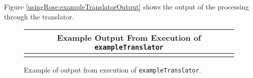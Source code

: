    Figure \ref{usingRose:exampleTranslatorOutput} shows the output 
of the processing through the translator.

{\indent
{\mySmallFontSize

\begin{latexonly}
\begin{figure}[tb]
\begin{center}
\begin{tabular}{|c|} \hline
     Example Output From Execution of {\tt exampleTranslator}
\\\hline\hline

\\\hline
\end{tabular}
\end{center}
\caption{ Example of output from execution of {\tt exampleTranslator}. }
\end{figure}
\end{latexonly}

\begin{htmlonly}
   
\end{htmlonly}

\label{usingRose:exampleTranslatorOutput}

}
}

